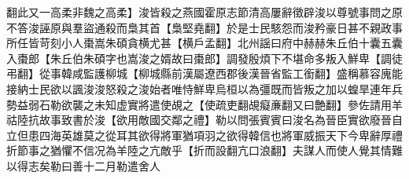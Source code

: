 翻此又一高柔非魏之高柔】浚皆殺之燕國霍原志節清高屢辭徵辟浚以尊號事問之原不答浚誣原與羣盜通殺而梟其首【梟堅堯翻】於是士民駭怨而浚矜豪日甚不親政事所任皆苛刻小人棗嵩朱碩貪横尤甚【横戶孟翻】北州謡曰府中赫赫朱丘伯十囊五囊入棗郎【朱丘伯朱碩字也嵩浚之婿故曰棗郎】調發殷煩下不堪命多叛入鮮卑【調徒弔翻】從事韓咸監護柳城【柳城縣前漢屬遼西郡後漢晉省監工銜翻】盛稱慕容廆能接納士民欲以諷浚浚怒殺之浚始者唯恃鮮卑烏桓以為彊既而皆叛之加以蝗旱連年兵勢益弱石勒欲襲之未知虚實將遣使覘之【使疏吏翻覘癡亷翻又曰艶翻】參佐請用羊祜陸抗故事致書於浚【欲用敵國交鄰之禮】勒以問張賓賓曰浚名為晉臣實欲廢晉自立但患四海英雄莫之從耳其欲得將軍猶項羽之欲得韓信也將軍威振天下今卑辭厚禮折節事之猶懼不信况為羊陸之亢敵乎【折而設翻亢口浪翻】夫謀人而使人覺其情難以得志矣勒曰善十二月勒遣舍人